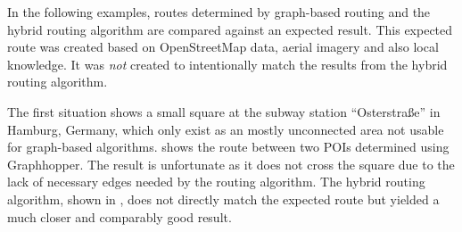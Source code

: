 			In the following examples, routes determined by graph-based routing and the hybrid routing algorithm are compared against an expected result.
			This expected route was created based on OpenStreetMap data, aerial imagery and also local knowledge.
			It was \emph{not} created to intentionally match the results from the hybrid routing algorithm.
		
			The first situation shows a small square at the subway station \enquote{Osterstraße} in Hamburg, Germany, which only exist as an mostly unconnected area not usable for graph-based algorithms.
			 shows the route between two POIs determined using Graphhopper.
			The result is unfortunate as it does not cross the square due to the lack of necessary edges needed by the routing algorithm.
			The hybrid routing algorithm, shown in , does not directly match the expected route but yielded a much closer and comparably good result.
			
